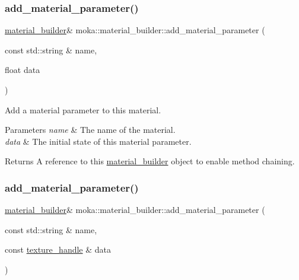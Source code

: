\subsubsection{\texorpdfstring{add\_material\_parameter()}{add\_material\_parameter()}\hspace{0.1cm}{\footnotesize\ttfamily [2/7]}}
{\footnotesize\ttfamily \mbox{\hyperlink{classmoka_1_1material__builder}{material\+\_\+builder}}\& moka\+::material\+\_\+builder\+::add\+\_\+material\+\_\+parameter (\begin{DoxyParamCaption}\item[{const std\+::string \&}]{name,  }\item[{float}]{data }\end{DoxyParamCaption})}



Add a material parameter to this material. 


\begin{DoxyParams}{Parameters}
{\em name} & The name of the material. \\
\hline
{\em data} & The initial state of this material parameter. \\
\hline
\end{DoxyParams}
\begin{DoxyReturn}{Returns}
A reference to this \mbox{\hyperlink{classmoka_1_1material__builder}{material\+\_\+builder}} object to enable method chaining. 
\end{DoxyReturn}
\mbox{\label{classmoka_1_1material__builder_a3f5539f47e509777bfd5f552120aa223}} 
\subsubsection{\texorpdfstring{add\_material\_parameter()}{add\_material\_parameter()}\hspace{0.1cm}{\footnotesize\ttfamily [3/7]}}
{\footnotesize\ttfamily \mbox{\hyperlink{classmoka_1_1material__builder}{material\+\_\+builder}}\& moka\+::material\+\_\+builder\+::add\+\_\+material\+\_\+parameter (\begin{DoxyParamCaption}\item[{const std\+::string \&}]{name,  }\item[{const \mbox{\hyperlink{structmoka_1_1texture__handle}{texture\+\_\+handle}} \&}]{data }\end{DoxyParamCaption})}



